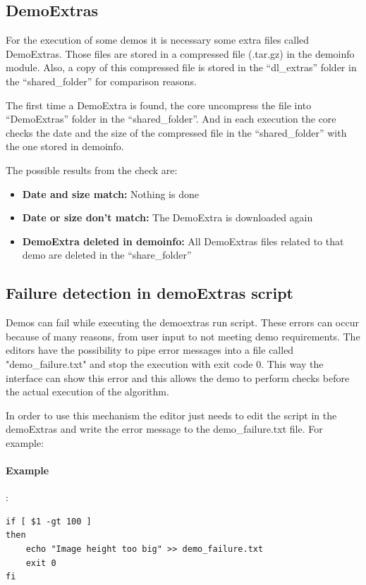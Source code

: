 \subsection{DemoExtras}

For the execution of some demos it is necessary some extra files called DemoExtras. Those files are stored in a compressed file (.tar.gz)
in the demoinfo module. Also, a copy of this compressed file is stored in the ``dl\_extras'' folder in the ``shared\_folder'' for comparison
reasons.

The first time a DemoExtra is found, the core uncompress the file into ``DemoExtras'' folder in the ``shared\_folder''. And in each execution
the core checks the date and the size of the compressed file in the ``shared\_folder'' with the one stored in demoinfo.

The possible results from the check are:
\begin{itemize}
 \item \textbf{Date and size match:} Nothing is done
 \item \textbf{Date or size don't match:} The DemoExtra is downloaded again
 \item \textbf{DemoExtra deleted in demoinfo:} All DemoExtras files related to that demo are deleted in the ``share\_folder''
\end{itemize}

\subsection{Failure detection in demoExtras script}

Demos can fail while executing the demoextras run script. These errors can occur because of many reasons, from user input to not meeting demo 
requirements. The editors have the possibility to pipe error messages into a file called "demo\_failure.txt" and stop the execution with exit
code 0. This way the interface can show this error and this allows the demo to perform checks before the actual execution of the algorithm.

In order to use this mechanism the editor just needs to edit the script in the demoExtras and write the error message to the demo\_failure.txt file. 
For example:
\paragraph{Example}:\\
\begin{verbatim}
if [ $1 -gt 100 ]
then
    echo "Image height too big" >> demo_failure.txt
    exit 0
fi
\end{verbatim} 